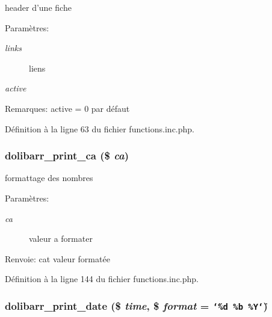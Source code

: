 header d'une fiche 

\begin{Desc}
\item[Param\`{e}tres:]
\begin{description}
\item[{\em links}]liens \item[{\em active}]\end{description}
\end{Desc}
\begin{Desc}
\item[Remarques:]active = 0 par d\'{e}faut \end{Desc}


D\'{e}finition \`{a} la ligne 63 du fichier functions.inc.php.\hypertarget{functions_8inc_8php_a5}{
\subsubsection[dolibarr\_\-print\_\-ca]{\setlength{\rightskip}{0pt plus 5cm}dolibarr\_\-print\_\-ca (\$ {\em ca})}}
\label{functions_8inc_8php_a5}


formattage des nombres 

\begin{Desc}
\item[Param\`{e}tres:]
\begin{description}
\item[{\em ca}]valeur a formater \end{description}
\end{Desc}
\begin{Desc}
\item[Renvoie:]cat valeur format\'{e}e \end{Desc}


D\'{e}finition \`{a} la ligne 144 du fichier functions.inc.php.\hypertarget{functions_8inc_8php_a6}{
\subsubsection[dolibarr\_\-print\_\-date]{\setlength{\rightskip}{0pt plus 5cm}dolibarr\_\-print\_\-date (\$ {\em time}, \$ {\em format} = {\tt \char`\"{}\%d\ \%b\ \%Y\char`\"{}})}}
\label{functions_8inc_8php_a6}



